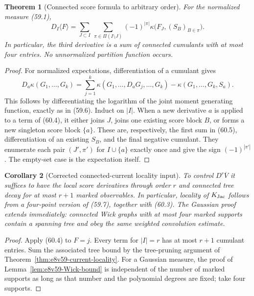 \documentclass[11pt,oneside]{book}
\newtheorem{theorem}{Theorem}[chapter]
\newtheorem{corollary}[theorem]{Corollary}
\theoremstyle{definition}
\theoremstyle{remark}
\begin{document}
\begin{theorem}[Connected score formula to arbitrary order]
\label{thm:e8v60-all-score}
For the normalized measure (59.1),
\[
 \boxed{
 D_I\langle F\rangle
 =\sum_{J\subset I}\ 
   \sum_{\pi\in\Pi(I\setminus J)}
   (-1)^{|\pi|}
   \kappa\bigl(F_J,(S_B)_{B\in\pi}\bigr).}                 \tag{60.4}
\]
In particular, the third derivative is a sum of connected
cumulants with at most four entries.  No unnormalized partition
function occurs.
\end{theorem}

\begin{proof}
For normalized expectations, differentiation of a cumulant gives
\[
 D_a\kappa(G_1,\ldots,G_k)
 =\sum_{j=1}^k
   \kappa(G_1,\ldots,D_aG_j,\ldots,G_k)
  -\kappa(G_1,\ldots,G_k,S_a).                               \tag{60.5}
\]
This follows by differentiating the logarithm of the joint moment
generating function, exactly as in (59.6).  Induct on \(|I|\).
When a new derivative \(a\) is applied to a term of (60.4), it
either joins \(J\), joins one existing score block \(B\), or forms
a new singleton score block \(\{a\}\).  These are, respectively,
the first sum in (60.5), differentiation of an existing \(S_B\),
and the final negative cumulant.  They enumerate each pair
\((J',\pi')\) for \(I\cup\{a\}\) exactly once and give the sign
\((-1)^{|\pi'|}\).  The empty-set case is the expectation itself.
\end{proof}

\begin{corollary}[Corrected connected-current locality input]
\label{cor:e8v60-third-current-locality}
To control \(D^r\overline V\) it suffices to have the local score
derivatives through order \(r\) and connected tree decay for at
most \(r+1\) marked observables.  In particular, locality of
\(K_{\rm Jac}\) follows from a four-point version of (59.7),
together with (60.3).  The Gaussian proof extends immediately:
connected Wick graphs with at most four marked supports contain a
spanning tree and obey the same weighted convolution estimate.
\end{corollary}

\begin{proof}
Apply (60.4) to \(F=j\).  Every term for \(|I|=r\) has at most
\(r+1\) cumulant entries.  Sum the associated tree bound by the
tree-pruning argument of Theorem~\ref{thm:e8v59-current-locality}.
For a Gaussian measure, the proof of
Lemma~\ref{lem:e8v59-Wick-bound} is independent of the number of
marked supports as long as that number and the polynomial degrees
are fixed; take four supports.
\end{proof}
\end{document}
